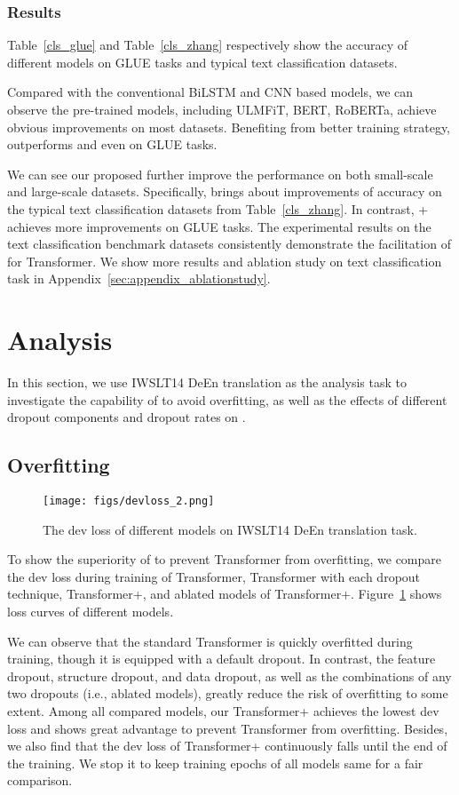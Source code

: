 \documentclass[11pt]{article}
\begin{document}
\subsubsection{Results}
Table~\ref{cls_glue} and Table~\ref{cls_zhang} respectively show the accuracy of different models on GLUE tasks and typical text classification datasets. 

Compared with the conventional BiLSTM and CNN based models, we can observe the pre-trained models, including ULMFiT, BERT, RoBERTa,  achieve obvious improvements on most datasets. 
Benefiting from better training strategy,  outperforms  and even  on GLUE tasks.

We can see our proposed  further improve the performance  on both small-scale and large-scale datasets. Specifically,  brings about  improvements of accuracy on the typical text classification datasets from Table~\ref{cls_zhang}. In contrast, + achieves more improvements on GLUE tasks. The experimental results on the  text classification benchmark datasets consistently demonstrate the facilitation of  for Transformer. We show more results and ablation study on text classification task in Appendix~\ref{sec:appendix_ablationstudy}.



\section{Analysis}

In this section, we use IWSLT14 DeEn translation as the analysis task to investigate the capability of  to avoid overfitting, as well as the effects of different dropout components and dropout rates on .

\subsection{Overfitting}


\begin{figure}[!tbp]
\centering
\texttt{[image: figs/devloss\_2.png]}
\caption{The dev loss of different models on IWSLT14 DeEn translation task.}
\label{fig:loss}
\end{figure}
To show the superiority of  to prevent Transformer from overfitting, we compare the dev loss during training of Transformer, Transformer with each dropout technique, Transformer+, and ablated models of Transformer+. Figure~\ref{fig:loss} shows loss curves of different models.

We can observe that the standard Transformer is quickly overfitted during training, though it is equipped with a default dropout. In contrast, the feature dropout, structure dropout, and data dropout, as well as the combinations of any two dropouts (i.e., ablated models), greatly reduce the risk of overfitting to some extent. Among all compared models, our Transformer+ achieves the lowest dev loss and shows great advantage to prevent Transformer from overfitting. Besides, we also find that the dev loss of Transformer+ continuously falls until the end of the training. We stop it to keep training epochs of all models same for a fair comparison.
\end{document}

